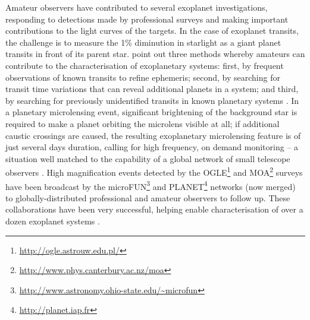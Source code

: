 \documentclass{ar2e}
\begin{document}
Amateur observers have contributed to several exoplanet investigations,
responding to detections made by professional surveys and making important
contributions to the light curves of the targets. In the case of exoplanet
transits, the challenge is to measure the 1\% diminution in starlight as a giant
planet transits in front of its parent star. \citet{14mousis_proam} point out three
methods whereby amateurs can contribute to the characterisation of exoplanetary
systems: first, by frequent observations of known transits to refine ephemeris;
second, by searching for transit time variations that can reveal additional
planets in a system; and third, by searching for previously unidentified
transits in known planetary systems \citep[e.g., the discovery of the transit of
HD 80606b from a 30 cm telescope near London,][]{09fossey}. In a planetary
microlensing event, significant brightening of the background star is required
to make a planet orbiting the microlens visible at all; if additional caustic
crossings are caused, the resulting exoplanetary microlensing feature is of just
several days duration, calling for high frequency, on demand monitoring -- a
situation well matched to the capability of a global network of small telescope
observers \citep[see e.g.\ ][]{Christie2006}. High magnification events
detected by the  OGLE\footnote{\url{http://ogle.astrouw.edu.pl/}} and
MOA\footnote{\url{http://www.phys.canterbury.ac.nz/moa}} surveys have been
broadcast by the
microFUN\footnote{\url{http://www.astronomy.ohio-state.edu/~microfun}} and
PLANET\footnote{\url{http://planet.iap.fr}} networks (now merged) to
globally-distributed professional and amateur observers to follow up. These
collaborations have been very successful, helping enable characterisation of
over a dozen exoplanet systems \citep[see e.g.\ ][and references
therein]{Udalski++2005,Gould++2014}.


% 
% 
\end{document}
